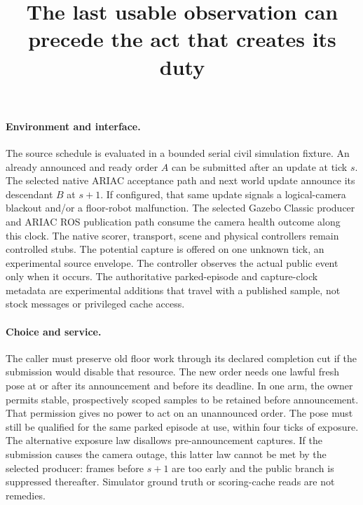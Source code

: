 \documentclass{article}
\begin{document}
\title{The last usable observation can precede the act that creates its duty}
\maketitle

\paragraph{Environment and interface.}
The source schedule is evaluated in a bounded serial civil
simulation fixture. An already announced and ready order \(A\)
can be submitted after an update at tick \(s\). The selected
native ARIAC acceptance path and next world update announce its
descendant \(B\) at \(s+1\). If configured, that same update
signals a logical-camera blackout and/or a floor-robot
malfunction. The selected Gazebo Classic producer and ARIAC ROS
publication path consume the camera health outcome along this
clock. The native scorer, transport, scene and physical
controllers remain controlled stubs. The potential capture is
offered on one unknown tick, an experimental source envelope.
The controller observes the actual public event only when it
occurs. The authoritative parked-episode and capture-clock
metadata are experimental additions that travel with a published
sample, not stock messages or privileged cache access.

\paragraph{Choice and service.}
The caller must preserve old floor work through its declared
completion cut if the submission would disable that resource.
The new order needs one lawful fresh pose at or after its
announcement and before its deadline. In one arm, the owner
permits stable, prospectively scoped samples to be retained before
announcement. That permission gives no power to act on an
unannounced order. The pose must still be qualified for the same
parked episode at use, within four ticks of exposure. The
alternative exposure law disallows pre-announcement captures.
If the submission causes the camera outage, this latter law
cannot be met by the selected producer: frames before \(s+1\)
are too early and the public branch is suppressed thereafter.
Simulator ground truth or scoring-cache reads are not remedies.
\end{document}
